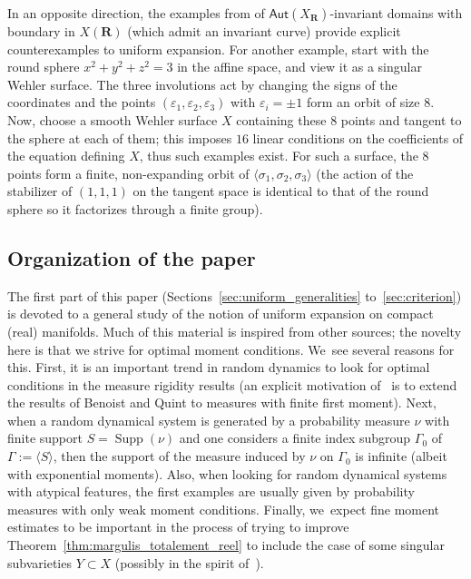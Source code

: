\documentclass[JEP,XML,SOM,Unicode,published]{cedram}
\let\epsilon\varepsilon
\DeclareMathOperator{\supp}{Supp}
\def\R{\mathbf{R}}
\newcommand\Aut{\mathsf{Aut}}
\theoremstyle{plain}
\theoremstyle{definition}
\begin{document}
In an opposite direction, the examples from \cite[\S 9]{invariant} of $\Aut(X_\R)$-invariant
domains with boundary in $X(\R)$ (which admit an invariant curve)
provide explicit counterexamples to uniform expansion.
For another example, start with the round sphere $x^2+y^2+z^2=3$ in the affine space, and view it as a singular
Wehler surface. The three involutions act by changing the signs of the coordinates and the points $(\epsilon_1,\epsilon_2,\epsilon_3)$
with $\epsilon_i=\pm 1$ form an orbit of size $8$. Now, choose a smooth Wehler surface $X$ containing these $8$ points and tangent to the sphere at each of them; this imposes $16$ linear conditions on the coefficients of the equation defining $X$, thus such examples exist.
For such a surface, the $8$ points form a finite, non-expanding orbit of $\langle\sigma_1, \sigma_2, \sigma_3\rangle$ (the action of the stabilizer of $(1,1,1)$ on the tangent space is identical to that of the round sphere so it factorizes through a finite group).

\subsection{Organization of the paper}
The first part of this paper (Sections~\ref{sec:uniform_generalities} to~\ref{sec:criterion}) is
devoted to a general study of the notion of uniform expansion on compact (real) manifolds.
Much of this material is inspired from other sources; the novelty here is that we strive for
optimal moment conditions. We~see several reasons for this. First, it is an important trend
in random dynamics to look for optimal conditions in the measure rigidity results (an explicit motivation of~\cite{Eskin-Lindenstrauss:RandomWalk} is to extend the results of Benoist and Quint to measures with finite first moment). Next,
when a random dynamical system is generated by a probability measure $\nu$ with finite support $S=\supp(\nu)$ and one considers a finite index subgroup $\Gamma_0$ of $\Gamma:=\langle S\rangle$, then the support of the measure induced by $\nu$ on $\Gamma_0$ is infinite (albeit with exponential moments). Also, when looking for random dynamical systems with atypical features, the first examples are usually given by probability measures with only weak moment conditions.
Finally, we~expect fine moment estimates to be important in the process of trying to
improve Theorem~\ref{thm:margulis_totalement_reel} to include the case of some
singular subvarieties $Y\subset X$ (possibly in the spirit of~\hbox{\cite[Th.\,B']{benard-desaxce}}).
\end{document}
